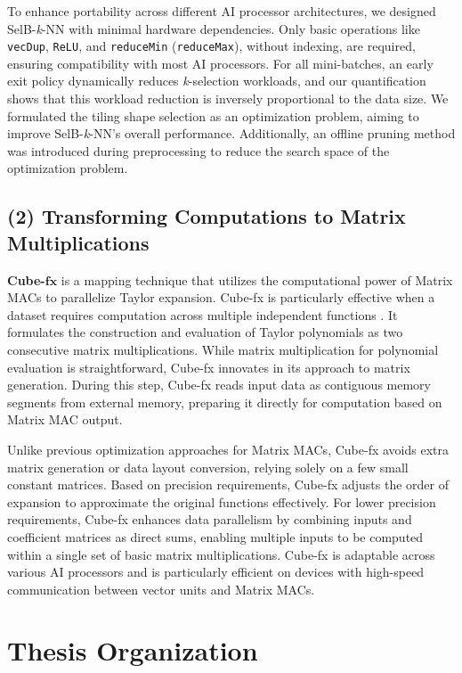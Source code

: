 To enhance portability across different AI processor architectures, we designed SelB-\textit{k}-NN with minimal hardware dependencies. Only basic operations like \verb|vecDup|, \verb|ReLU|, and \verb|reduceMin| (\verb|reduceMax|), without indexing, are required, ensuring compatibility with most AI processors. For all mini-batches, an early exit policy dynamically reduces \textit{k}-selection workloads, and our quantification shows that this workload reduction is inversely proportional to the data size. We formulated the tiling shape selection as an optimization problem, aiming to improve SelB-\textit{k}-NN's overall performance. Additionally, an offline pruning method was introduced during preprocessing to reduce the search space of the optimization problem.

\subsection{(2) Transforming Computations to Matrix Multiplications}

\textbf{Cube-}$\mathbf{fx}$ is a mapping technique that utilizes the computational power of Matrix MACs to parallelize Taylor expansion. Cube-fx is particularly effective when a dataset requires computation across multiple independent functions \cite{boyd2004convex, guyon2006introduction, DBLP:conf/icpr/ManessiR18}. It formulates the construction and evaluation of Taylor polynomials as two consecutive matrix multiplications. While matrix multiplication for polynomial evaluation is straightforward, Cube-fx innovates in its approach to matrix generation. During this step, Cube-fx reads input data as contiguous memory segments from external memory, preparing it directly for computation based on Matrix MAC output.

Unlike previous optimization approaches for Matrix MACs, Cube-fx avoids extra matrix generation or data layout conversion, relying solely on a few small constant matrices. Based on precision requirements, Cube-fx adjusts the order of expansion to approximate the original functions effectively. For lower precision requirements, Cube-fx enhances data parallelism by combining inputs and coefficient matrices as direct sums, enabling multiple inputs to be computed within a single set of basic matrix multiplications. Cube-fx is adaptable across various AI processors and is particularly efficient on devices with high-speed communication between vector units and Matrix MACs.

\section{Thesis Organization}
\label{sec_1_4_organization}

